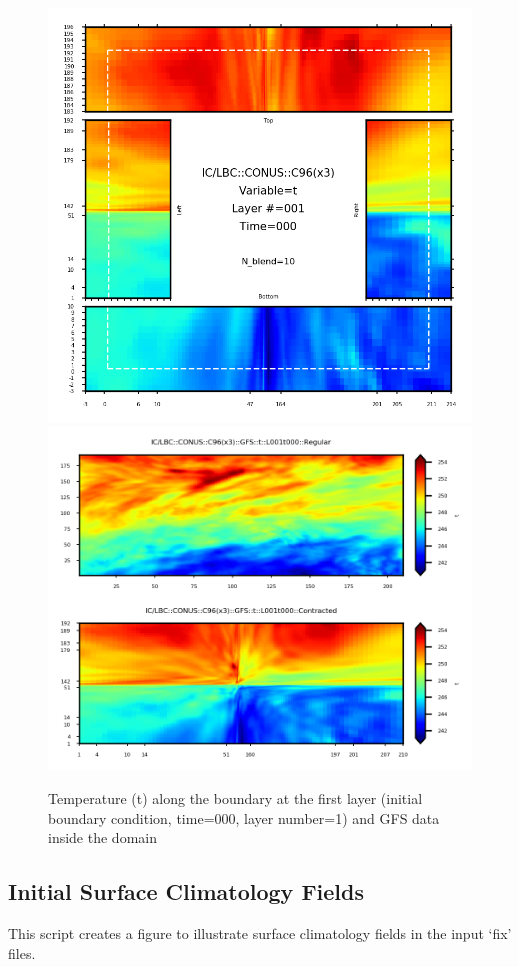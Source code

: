 \documentclass[11pt,fleqn]{report}              %
\begin{document}
\begin{figure}[ht!]
  \centering
  \includegraphics[width=0.65\linewidth]{fv3_icbc_CONUS_C96_t_L001_t000_B10.png}
  \includegraphics[width=0.7\linewidth]{fv3_icbc_CONUS_C96_t_L001_gfs.png}  
  \caption{Temperature (t) along the boundary at the first layer (initial boundary condition, time=000, layer number=1) and GFS data inside the domain}
  \label{fig:py_icbc_vs}
\end{figure}

\clearpage


\subsection{Initial Surface Climatology Fields}

This script creates a figure to illustrate surface climatology fields in the input `fix' files.
\end{document}
